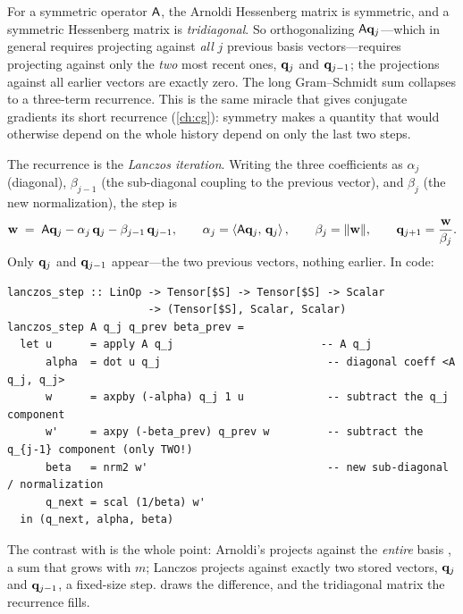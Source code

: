 \begin{keyidea}
For a symmetric operator $\mathsf{A}$, the Arnoldi Hessenberg matrix is symmetric, and a
symmetric Hessenberg matrix is \emph{tridiagonal}. So orthogonalizing
$\mathsf{A}\mathbf{q}_j$---which in general requires projecting against \emph{all} $j$ previous
basis vectors---requires projecting against only the \emph{two} most recent ones,
$\mathbf{q}_j$ and $\mathbf{q}_{j-1}$; the projections against all earlier vectors are exactly zero.
The long Gram--Schmidt sum collapses to a three-term recurrence. This is the same
miracle that gives conjugate gradients its short recurrence (\cref{ch:cg}): symmetry
makes a quantity that would otherwise depend on the whole history depend on only the
last two steps.
\end{keyidea}

The recurrence is the \emph{Lanczos iteration}. Writing the three coefficients as
$\alpha_j$ (diagonal), $\beta_{j-1}$ (the sub-diagonal coupling to the previous
vector), and $\beta_j$ (the new normalization), the step is
\[
  \mathbf{w} \;=\; \mathsf{A}\mathbf{q}_j - \alpha_j\,\mathbf{q}_j - \beta_{j-1}\,\mathbf{q}_{j-1},
  \qquad
  \alpha_j = \left\langle \mathsf{A}\mathbf{q}_j,\, \mathbf{q}_j\right\rangle,
  \qquad
  \beta_j = \lVert\mathbf{w}\rVert,
  \qquad
  \mathbf{q}_{j+1} = \frac{\mathbf{w}}{\beta_j}.
\]
Only $\mathbf{q}_j$ and $\mathbf{q}_{j-1}$ appear---the two previous vectors, nothing earlier. In
code:

\begin{lstlisting}[style=l4style]
lanczos_step :: LinOp -> Tensor[$S] -> Tensor[$S] -> Scalar
                      -> (Tensor[$S], Scalar, Scalar)
lanczos_step A q_j q_prev beta_prev =
  let u      = apply A q_j                       -- A q_j
      alpha  = dot u q_j                          -- diagonal coeff <A q_j, q_j>
      w      = axpby (-alpha) q_j 1 u             -- subtract the q_j component
      w'     = axpy (-beta_prev) q_prev w         -- subtract the q_{j-1} component (only TWO!)
      beta   = nrm2 w'                            -- new sub-diagonal / normalization
      q_next = scal (1/beta) w'
  in (q_next, alpha, beta)
\end{lstlisting}

The contrast with  is the whole point: Arnoldi's
 projects against the \emph{entire} basis , a sum
that grows with $m$; Lanczos projects against exactly two stored vectors,
$\mathbf{q}_j$ and $\mathbf{q}_{j-1}$, a fixed-size step.  draws the difference,
and the tridiagonal matrix the recurrence fills.

